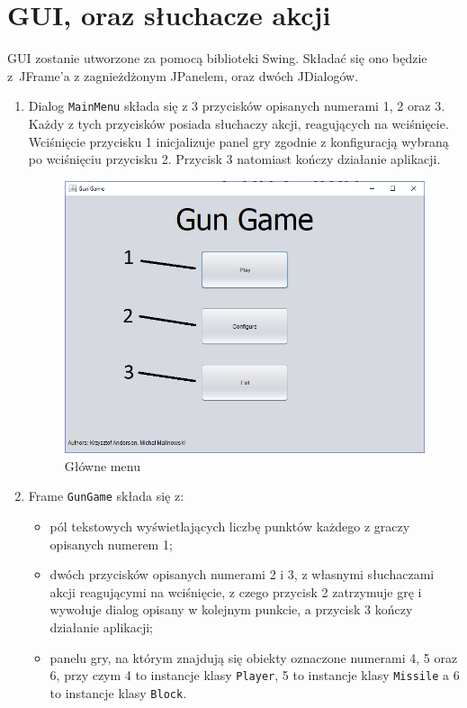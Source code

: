 \documentclass[12pt]{report}
\newcommand{\code}[1]{\texttt{#1}}
\begin{document}
\section{GUI, oraz słuchacze akcji}
GUI zostanie utworzone za pomocą biblioteki Swing. Składać się ono będzie z~JFrame'a z zagnieżdżonym JPanelem, oraz dwóch JDialogów. 
\begin{enumerate}
    \item Dialog \code{MainMenu} składa się z 3 przycisków opisanych numerami 1, 2 oraz 3. Każdy z tych przycisków posiada słuchaczy akcji, reagujących na wciśnięcie. Wciśnięcie przycisku 1 inicjalizuje panel gry zgodnie z konfiguracją wybraną po wciśnięciu przycisku 2. Przycisk 3 natomiast kończy działanie aplikacji.
    \begin{figure}[H]
    \centering
    \includegraphics[width=14cm]{obrazy/mainmenuscreen.png}
    \caption{Główne menu}
    \label{main menu}
    \end{figure}
    \item Frame \code{GunGame} składa się z:
    \begin{itemize}
        \item pól tekstowych wyświetlających liczbę punktów każdego z graczy opisanych numerem 1;
        \item dwóch przycisków opisanych numerami 2 i 3, z własnymi słuchaczami akcji reagującymi na wciśnięcie, z czego przycisk 2 zatrzymuje grę i wywołuje dialog opisany w kolejnym punkcie, a przycisk 3 kończy działanie aplikacji;
        \item panelu gry, na którym znajdują się obiekty oznaczone numerami 4, 5 oraz 6, przy czym 4 to instancje klasy \code{Player}, 5 to instancje klasy \code{Missile} a 6 to instancje klasy \code{Block}.

\end{itemize}
\end{enumerate}
\end{document}
